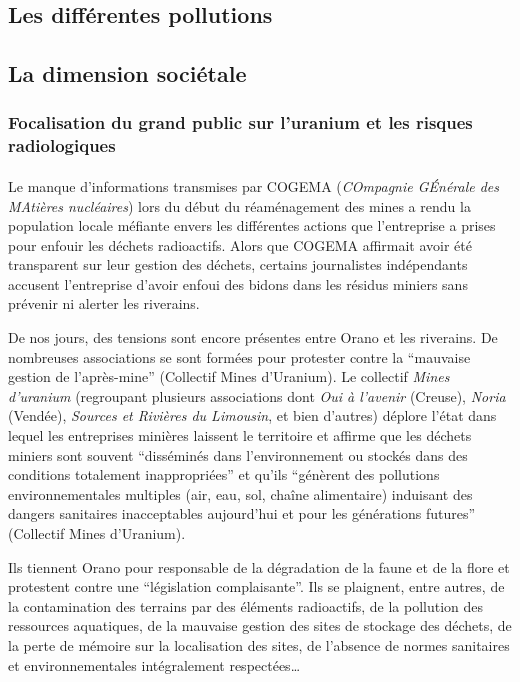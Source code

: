 \documentclass{article}
\begin{document}
\subsection{Les différentes pollutions}

 
\subsection{La dimension sociétale}
\subsubsection{Focalisation du grand public sur l'uranium et les risques radiologiques}
\paragraph{} Le manque d’informations transmises par COGEMA (\emph{COmpagnie GÉnérale des MAtières nucléaires}) lors du début du réaménagement des mines a rendu la population locale méfiante envers les différentes actions que l’entreprise a prises pour enfouir les déchets radioactifs. Alors que COGEMA affirmait avoir été transparent sur leur gestion des déchets, certains journalistes indépendants accusent l’entreprise d’avoir enfoui des bidons dans les résidus miniers sans prévenir ni alerter les riverains. 

De nos jours, des tensions sont encore présentes entre Orano et les riverains. De nombreuses associations se sont formées pour protester contre la “mauvaise gestion de l'après-mine” (Collectif Mines d’Uranium). Le collectif \emph{Mines d’uranium} (regroupant plusieurs associations dont \emph{Oui à l'avenir} (Creuse), \emph{Noria} (Vendée), \emph{Sources et Rivières du Limousin}, et bien d’autres) déplore l’état dans lequel les entreprises minières laissent le territoire et  affirme que les déchets miniers sont souvent “disséminés dans l’environnement ou stockés dans des conditions totalement inappropriées” et qu’ils “génèrent des pollutions environnementales multiples (air, eau, sol, chaîne alimentaire) induisant des dangers sanitaires inacceptables aujourd’hui et pour les générations futures” (Collectif Mines d’Uranium). 


Ils tiennent Orano pour responsable de la dégradation de la faune et de la flore et protestent contre une “législation complaisante”. Ils se plaignent, entre autres, de la contamination des terrains par des éléments radioactifs, de la pollution des ressources aquatiques, de la mauvaise gestion des sites de stockage des déchets, de la perte de mémoire sur la localisation des sites, de l’absence de normes sanitaires et environnementales intégralement respectées… 
\end{document}
